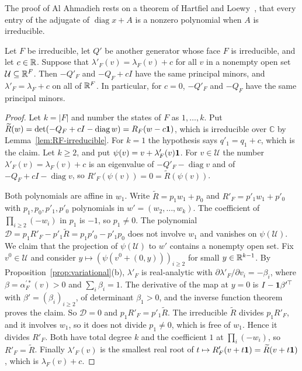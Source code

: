 The proof of Al Ahmadieh rests on a theorem of Hartfiel and
Loewy~\cite[Theorem~1]{hartfielloewy1984}, that every entry of the adjugate of
$\operatorname{diag}x+A$ is a nonzero polynomial when $A$ is irreducible.

\begin{lemma}\label{lem:perron-branch}
Let $F$ be irreducible, let $Q'$ be another generator whose face $F$ is irreducible,
and let $c\in\mathbb{R}$. Suppose that $\lambda'_F(v)=\lambda_F(v)+c$ for all $v$ in a nonempty
open set $\mathcal U\subseteq\mathbb{R}^F$. Then $-Q'_F$ and $-Q_F+cI$ have the same principal
minors, and $\lambda'_F=\lambda_F+c$ on all of $\mathbb{R}^F$. In particular, for $c=0$,
$-Q'_F$ and $-Q_F$ have the same principal minors.
\end{lemma}

\begin{proof}
Let $k=|F|$ and number the states of $F$ as $1,\dots,k$. Put
$\widetilde R(w)=\det(-Q_F+cI-\operatorname{diag}w)=R_F(w-c\mathbf{1})$, which is
irreducible over $\mathbb C$ by Lemma~\ref{lem:RF-irreducible}. For $k=1$ the hypothesis
says $q'_1=q_1+c$, which is the claim. Let $k\ge2$, and put
$\psi(v)=v+\lambda'_F(v)\mathbf{1}$. For $v\in\mathcal U$ the number
$\lambda'_F(v)=\lambda_F(v)+c$ is an eigenvalue of $-Q'_F-\operatorname{diag}v$ and of
$-Q_F+cI-\operatorname{diag}v$, so $R'_F(\psi(v))=0=\widetilde R(\psi(v))$.

Both polynomials are affine in $w_1$. Write $\widetilde R=p_1w_1+p_0$ and
$R'_F=p'_1w_1+p'_0$ with $p_1,p_0,p'_1,p'_0$ polynomials in $w'=(w_2,\dots,w_k)$. The
coefficient of $\prod_{i\ge2}(-w_i)$ in $p_1$ is $-1$, so $p_1\ne0$. The polynomial
$\mathcal D=p_1R'_F-p'_1\widetilde R=p_1p'_0-p'_1p_0$ does not involve $w_1$ and vanishes
on $\psi(\mathcal U)$. We claim that the projection of $\psi(\mathcal U)$ to $w'$
contains a nonempty open set. Fix $v^0\in\mathcal U$ and consider
$y\mapsto(\psi(v^0+(0,y)))_{i\ge2}$ for small $y\in\mathbb{R}^{k-1}$. By
Proposition~\ref{prop:variational}(b), $\lambda'_F$ is real-analytic with
$\partial\lambda'_F/\partial v_i=-\beta_i$, where $\beta=\alpha^{\prime*}_F(v)>0$ and
$\sum_i\beta_i=1$. The derivative of the map at $y=0$ is $I-\mathbf{1}\beta'^\top$ with
$\beta'=(\beta_i)_{i\ge2}$, of determinant $\beta_1>0$, and the inverse function theorem
proves the claim. So $\mathcal D=0$ and $p_1R'_F=p'_1\widetilde R$. The irreducible
$\widetilde R$ divides $p_1R'_F$, and it involves $w_1$, so it does not divide $p_1\ne0$,
which is free of $w_1$. Hence it divides $R'_F$. Both have total degree $k$ and the
coefficient $1$ at $\prod_i(-w_i)$, so $R'_F=\widetilde R$. Finally $\lambda'_F(v)$ is the
smallest real root of $t\mapsto R'_F(v+t\mathbf{1})=\widetilde R(v+t\mathbf{1})$, which is
$\lambda_F(v)+c$.
\end{proof}

